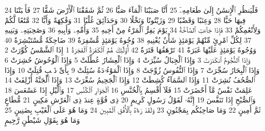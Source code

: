 {\tiny\colorbox{cl_aya}{24}} فَلْيَنظُرِ ٱلْإِنسَٰنُ إِلَىٰ طَعَامِهِۦٓ
{\tiny\colorbox{cl_aya}{25}} أَنَّا صَبَبْنَا ٱلْمَآءَ صَبًّا
{\tiny\colorbox{cl_aya}{26}} ثُمَّ شَقَقْنَا ٱلْأَرْضَ شَقًّا
{\tiny\colorbox{cl_aya}{27}} فَأَنۢبَتْنَا فِيهَا حَبًّا
{\tiny\colorbox{cl_aya}{28}} وَعِنَبًا وَقَضْبًا
{\tiny\colorbox{cl_aya}{29}} وَزَيْتُونًا وَنَخْلًا
{\tiny\colorbox{cl_aya}{30}} وَحَدَآئِقَ غُلْبًا
{\tiny\colorbox{cl_aya}{31}} وَفَٰكِهَةً وَأَبًّا
{\tiny\colorbox{cl_aya}{32}} مَّتَٰعًا لَّكُمْ وَلِأَنْعَٰمِكُمْ
{\tiny\colorbox{cl_aya}{33}} فَإِذَا جَآءَتِ ٱلصَّآخَّةُ
{\tiny\colorbox{cl_aya}{34}} يَوْمَ يَفِرُّ ٱلْمَرْءُ مِنْ أَخِيهِ
{\tiny\colorbox{cl_aya}{35}} وَأُمِّهِۦ وَأَبِيهِ
{\tiny\colorbox{cl_aya}{36}} وَصَٰحِبَتِهِۦ وَبَنِيهِ
{\tiny\colorbox{cl_aya}{37}} لِكُلِّ ٱمْرِئٍ مِّنْهُمْ يَوْمَئِذٍ شَأْنٌ يُغْنِيهِ
{\tiny\colorbox{cl_aya}{38}} وُجُوهٌ يَوْمَئِذٍ مُّسْفِرَةٌ
{\tiny\colorbox{cl_aya}{39}} ضَاحِكَةٌ مُّسْتَبْشِرَةٌ
{\tiny\colorbox{cl_aya}{40}} وَوُجُوهٌ يَوْمَئِذٍ عَلَيْهَا غَبَرَةٌ
{\tiny\colorbox{cl_aya}{41}} تَرْهَقُهَا قَتَرَةٌ
{\tiny\colorbox{cl_aya}{42}} أُو۟لَٰٓئِكَ هُمُ ٱلْكَفَرَةُ ٱلْفَجَرَةُ
{\tiny\colorbox{cl_aya}{1}} إِذَا ٱلشَّمْسُ كُوِّرَتْ
{\tiny\colorbox{cl_aya}{2}} وَإِذَا ٱلنُّجُومُ ٱنكَدَرَتْ
{\tiny\colorbox{cl_aya}{3}} وَإِذَا ٱلْجِبَالُ سُيِّرَتْ
{\tiny\colorbox{cl_aya}{4}} وَإِذَا ٱلْعِشَارُ عُطِّلَتْ
{\tiny\colorbox{cl_aya}{5}} وَإِذَا ٱلْوُحُوشُ حُشِرَتْ
{\tiny\colorbox{cl_aya}{6}} وَإِذَا ٱلْبِحَارُ سُجِّرَتْ
{\tiny\colorbox{cl_aya}{7}} وَإِذَا ٱلنُّفُوسُ زُوِّجَتْ
{\tiny\colorbox{cl_aya}{8}} وَإِذَا ٱلْمَوْءُۥدَةُ سُئِلَتْ
{\tiny\colorbox{cl_aya}{9}} بِأَىِّ ذَنۢبٍ قُتِلَتْ
{\tiny\colorbox{cl_aya}{10}} وَإِذَا ٱلصُّحُفُ نُشِرَتْ
{\tiny\colorbox{cl_aya}{11}} وَإِذَا ٱلسَّمَآءُ كُشِطَتْ
{\tiny\colorbox{cl_aya}{12}} وَإِذَا ٱلْجَحِيمُ سُعِّرَتْ
{\tiny\colorbox{cl_aya}{13}} وَإِذَا ٱلْجَنَّةُ أُزْلِفَتْ
{\tiny\colorbox{cl_aya}{14}} عَلِمَتْ نَفْسٌ مَّآ أَحْضَرَتْ
{\tiny\colorbox{cl_aya}{15}} فَلَآ أُقْسِمُ بِٱلْخُنَّسِ
{\tiny\colorbox{cl_aya}{16}} ٱلْجَوَارِ ٱلْكُنَّسِ
{\tiny\colorbox{cl_aya}{17}} وَٱلَّيْلِ إِذَا عَسْعَسَ
{\tiny\colorbox{cl_aya}{18}} وَٱلصُّبْحِ إِذَا تَنَفَّسَ
{\tiny\colorbox{cl_aya}{19}} إِنَّهُۥ لَقَوْلُ رَسُولٍ كَرِيمٍ
{\tiny\colorbox{cl_aya}{20}} ذِى قُوَّةٍ عِندَ ذِى ٱلْعَرْشِ مَكِينٍ
{\tiny\colorbox{cl_aya}{21}} مُّطَاعٍ ثَمَّ أَمِينٍ
{\tiny\colorbox{cl_aya}{22}} وَمَا صَاحِبُكُم بِمَجْنُونٍ
{\tiny\colorbox{cl_aya}{23}} وَلَقَدْ رَءَاهُ بِٱلْأُفُقِ ٱلْمُبِينِ
{\tiny\colorbox{cl_aya}{24}} وَمَا هُوَ عَلَى ٱلْغَيْبِ بِضَنِينٍ
{\tiny\colorbox{cl_aya}{25}} وَمَا هُوَ بِقَوْلِ شَيْطَٰنٍ رَّجِيمٍ
